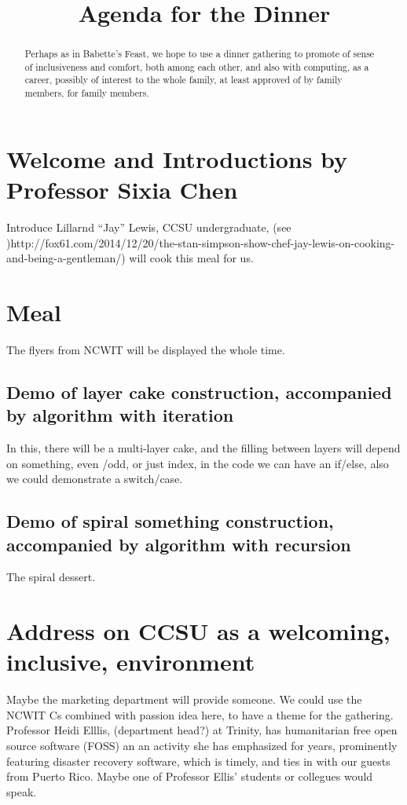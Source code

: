 \documentclass[]{article}
\title{Agenda for the Dinner}
\author{}
\begin{document}
\maketitle

\begin{abstract}
Perhaps as in Babette's Feast, we hope to use a dinner gathering to promote of sense of inclusiveness and comfort, both among each other, and also with computing, as a career, possibly of interest to the whole family, at least approved of by family members, for family members.
\end{abstract}

\section{Welcome and Introductions by Professor Sixia Chen}
Introduce Lillarnd ``Jay'' Lewis, CCSU undergraduate, (see )http://fox61.com/2014/12/20/the-stan-simpson-show-chef-jay-lewis-on-cooking-and-being-a-gentleman/)
will cook this meal for us.

\section{Meal}
The flyers from NCWIT will be displayed the whole time.

\subsection{Demo of layer cake construction, accompanied by algorithm with iteration}
In this, there will be a multi-layer cake, and the filling between layers will depend on something, even /odd, or just index,
in the code we can have an if/else, also we could demonstrate a switch/case.

\subsection{Demo of spiral something construction, accompanied by algorithm with recursion}
The spiral dessert.

\section{Address on CCSU as a welcoming, inclusive, environment}
Maybe the marketing department will provide someone.
We could use the NCWIT Cs combined with passion idea here, to have a theme for the gathering. Professor Heidi Elllis, (department head?) at Trinity, has humanitarian free open source software (FOSS) an an activity she has emphasized for years, prominently featuring disaster recovery software, which is timely, and ties in with our guests from Puerto Rico. Maybe one of Professor Ellis' students or collegues would speak.
\end{document}
